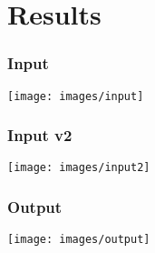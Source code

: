 \documentclass{beamer}
\begin{document}
\section{Results}

\begin{frame}
  \frametitle{Input}
  \begin{center}
    \texttt{[image: images/input]}%
  \end{center}
\end{frame}

\begin{frame}
  \frametitle{Input v2}
  \begin{center}
    \texttt{[image: images/input2]}%
  \end{center}
\end{frame}

\begin{frame}
  \frametitle{Output}
  \begin{center}
    \texttt{[image: images/output]}%
  \end{center}
\end{frame}
\end{document}
